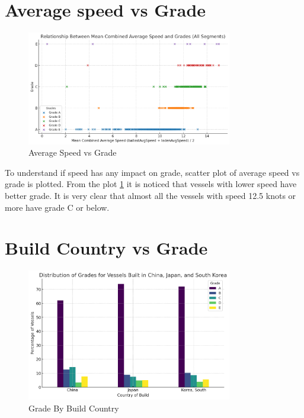 \section{Average speed vs Grade}
\begin{figure}[h]
    \centering
    \includegraphics[width=0.8\textwidth]{images/grade_speed.png}
    \caption{Average Speed vs Grade}
    \label{grade_speed}
\end{figure}

To understand if speed has any impact on grade, scatter plot of average speed vs grade is plotted.
From the plot \ref{grade_speed} it is noticed that vessels with lower speed have better grade. 
It is very clear that almost all the vessels with speed 12.5 knots or more have grade C or below.

\section{Build Country vs Grade}

\begin{figure}[h]
    \centering
    \includegraphics[width=0.8\textwidth]{images/grade_by_build_country.png}
    \caption{Grade By Build Country}
    \label{grade_by_build_country}
\end{figure}

